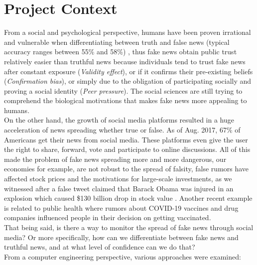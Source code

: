 \documentclass[10pt, english]{report}
\begin{document}
\section{Project Context}

From a social and psychological perspective, humans have been proven irrational and vulnerable when differentiating between truth and false news (typical accuracy ranges between 55\% and 58\%) \cite{zhou2019fake}, thus fake news obtain public trust relatively easier than truthful news because individuals tend to trust fake news after constant exposure (\textit{Validity effect}), or if it confirms their pre-existing beliefs (\textit{Confirmation bias}), or simply due to the obligation of participating socially and proving a social identity (\textit{Peer pressure}). The social sciences are still trying to comprehend the biological motivations that makes fake news more appealing to humans.\\

On the other hand, the growth of social media platforms resulted in a huge acceleration of news spreading whether true or false. As of Aug. 2017, 67\% \cite{zhou2019fake} of Americans get their news from social media. These platforms even give the user the right to share, forward, vote and participate to online discussions. All of this made the problem of fake news spreading more and more dangerous, our economies for example, are not robust to the spread of falsity, false rumors have affected stock prices and the motivations for large-scale investments, as we witnessed after a false tweet claimed that Barack Obama was injured in an explosion which caused \$130 billion drop in stock value \cite{vosoughi2018spread}. Another recent example is related to public health where rumors about COVID-19 vaccines and drug companies influenced people in their decision on getting vaccinated.\\

That being said, is there a way to monitor the spread of fake news through social media? Or more specifically, how can we differentiate between fake news and truthful news, and at what level of confidence can we do that?\\

From a computer engineering perspective, various approaches were examined:
\end{document}

